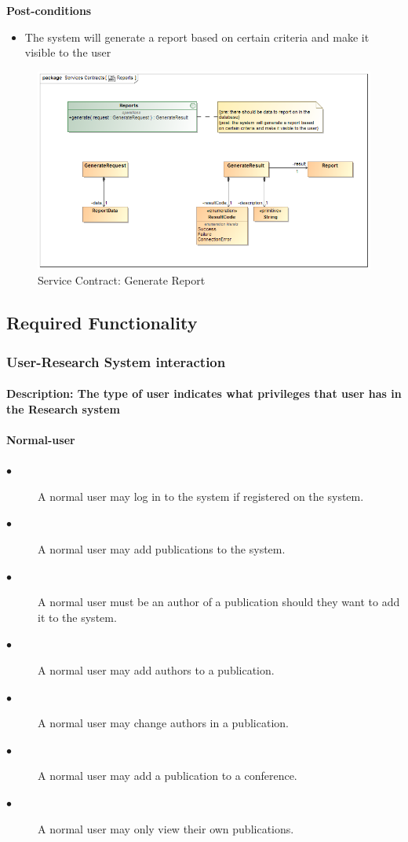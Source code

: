 \documentclass[a4paper]{article}
\begin{document}
	\textbf{Post-conditions}
	 \begin{itemize}
		\item The system will generate a report based on certain criteria and make it visible to the user
	\end{itemize}
		    	\begin{figure}[H]
		    		\centering
		    		\includegraphics[width=\textwidth]{5.1.17.Generate.Report.Services.Contract.png}
		    		\caption{Service Contract: Generate Report}
		    	\end{figure}
	
    \pagebreak

	
	\subsection{Required Functionality}
	\subsubsection{User-Research System interaction}
	\paragraph{\textbf{Description:} The type of user indicates what privileges that user has in the Research system}
	\paragraph{\textbf{Normal-user}}
	\begin{description}
		\item[$\bullet$] A normal user may log in to the system if registered on the system.
		\item[$\bullet$] A normal user may add publications to the system.
		\item[$\bullet$] A normal user must be an author of a publication should they want to add it to the system.
		\item[$\bullet$] A normal user may add authors to a publication.
		\item[$\bullet$] A normal user may change authors in a publication.
		\item[$\bullet$] A normal user may add a publication to a conference.
		\item[$\bullet$] A normal user may only view their own publications.
	\end{description}
\end{document}
